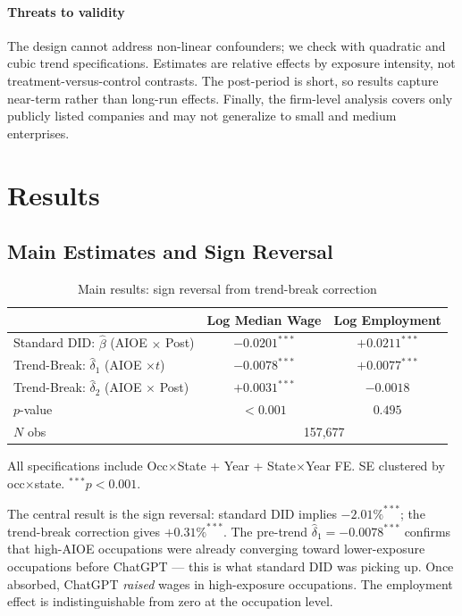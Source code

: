 \documentclass[12pt,a4paper]{article}
\begin{document}
\paragraph{Threats to validity} The design cannot address non-linear confounders; we check with quadratic and cubic trend specifications. Estimates are relative effects by exposure intensity, not treatment-versus-control contrasts. The post-period is short, so results capture near-term rather than long-run effects. Finally, the firm-level analysis covers only publicly listed companies and may not generalize to small and medium enterprises.

\section{Results}

\subsection{Main Estimates and Sign Reversal}

\begin{table}[H]
\centering
\caption{Main results: sign reversal from trend-break correction}
\label{tab:main}
\small
\begin{tabular}{lcc}
\toprule
 & \textbf{Log Median Wage} & \textbf{Log Employment} \\
\midrule
Standard DID: $\hat\beta$ (AIOE $\times$ Post)     & $-0.0201^{***}$ & $+0.0211^{***}$ \\[3pt]
Trend-Break: $\hat\delta_1$ (AIOE $\times t$)       & $-0.0078^{***}$ & $+0.0077^{***}$ \\
Trend-Break: $\hat\delta_2$ (AIOE $\times$ Post)    & $+0.0031^{***}$ & $-0.0018$ \\
\quad $p$-value                                      & $<0.001$        & $0.495$ \\
\midrule
$N$ obs & \multicolumn{2}{c}{157,677} \\
\bottomrule
\end{tabular}
\begin{flushleft}
\footnotesize All specifications include Occ$\times$State + Year + State$\times$Year FE. SE clustered by occ$\times$state. $^{***}p<0.001$.
\end{flushleft}
\end{table}

The central result is the sign reversal: standard DID implies $-2.01\%^{***}$; the trend-break correction gives $+0.31\%^{***}$. The pre-trend $\hat\delta_1=-0.0078^{***}$ confirms that high-AIOE occupations were already converging toward lower-exposure occupations before ChatGPT — this is what standard DID was picking up. Once absorbed, ChatGPT \emph{raised} wages in high-exposure occupations. The employment effect is indistinguishable from zero at the occupation level.
\end{document}
